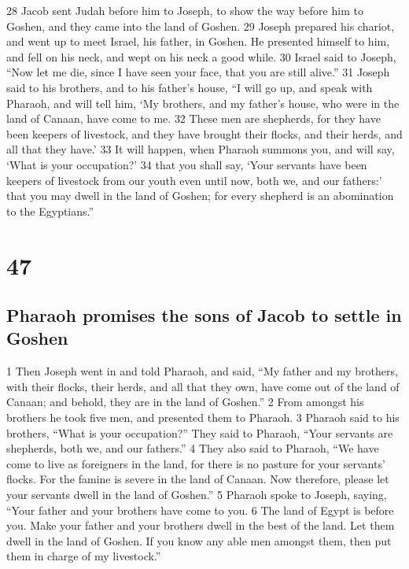 {28} Jacob sent Judah before him to Joseph, to show the way before him
to Goshen, and they came into the land of Goshen. {29} Joseph prepared
his chariot, and went up to meet Israel, his father, in Goshen. He
presented himself to him, and fell on his neck, and wept on his neck a
good while. {30} Israel said to Joseph, ``Now let me die, since I have
seen your face, that you are still alive.'' {31} Joseph said to his
brothers, and to his father's house, ``I will go up, and speak with
Pharaoh, and will tell him, `My brothers, and my father's house, who
were in the land of Canaan, have come to me. {32} These men are
shepherds, for they have been keepers of livestock, and they have
brought their flocks, and their herds, and all that they have.' {33} It
will happen, when Pharaoh summons you, and will say, `What is your
occupation?' {34} that you shall say, `Your servants have been keepers
of livestock from our youth even until now, both we, and our fathers:'
that you may dwell in the land of Goshen; for every shepherd is an
abomination to the Egyptians.''

\hypertarget{section-46}{%
\section{47}\label{section-46}}

\hypertarget{pharaoh-promises-the-sons-of-jacob-to-settle-in-goshen}{%
\subsection{Pharaoh promises the sons of Jacob to settle in
Goshen}\label{pharaoh-promises-the-sons-of-jacob-to-settle-in-goshen}}

{1} Then Joseph went in and told Pharaoh, and said, ``My father and my
brothers, with their flocks, their herds, and all that they own, have
come out of the land of Canaan; and behold, they are in the land of
Goshen.'' {2} From amongst his brothers he took five men, and presented
them to Pharaoh. {3} Pharaoh said to his brothers, ``What is your
occupation?'' They said to Pharaoh, ``Your servants are shepherds, both
we, and our fathers.'' {4} They also said to Pharaoh, ``We have come to
live as foreigners in the land, for there is no pasture for your
servants' flocks. For the famine is severe in the land of Canaan. Now
therefore, please let your servants dwell in the land of Goshen.'' {5}
Pharaoh spoke to Joseph, saying, ``Your father and your brothers have
come to you. {6} The land of Egypt is before you. Make your father and
your brothers dwell in the best of the land. Let them dwell in the land
of Goshen. If you know any able men amongst them, then put them in
charge of my livestock.''

